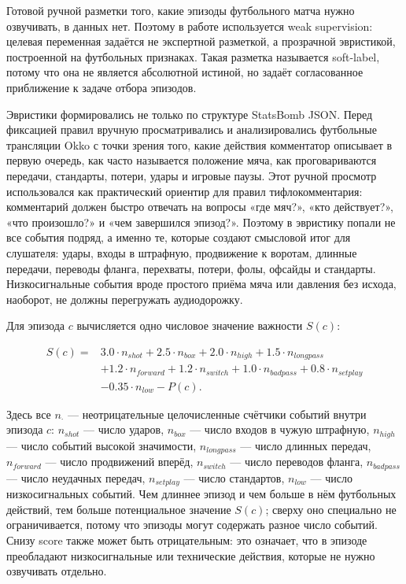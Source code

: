 \documentclass[a4paper,14pt]{extarticle}
\numberwithin{table}{section}
\numberwithin{figure}{section}
\numberwithin{equation}{section}
\begin{document}
Готовой ручной разметки того, какие эпизоды футбольного матча нужно озвучивать, в данных нет. Поэтому в работе используется weak supervision: целевая переменная задаётся не экспертной разметкой, а прозрачной эвристикой, построенной на футбольных признаках. Такая разметка называется soft-label, потому что она не является абсолютной истиной, но задаёт согласованное приближение к задаче отбора эпизодов.

Эвристики формировались не только по структуре StatsBomb JSON. Перед фиксацией правил вручную просматривались и анализировались футбольные трансляции Okko с точки зрения того, какие действия комментатор описывает в первую очередь, как часто называется положение мяча, как проговариваются передачи, стандарты, потери, удары и игровые паузы. Этот ручной просмотр использовался как практический ориентир для правил тифлокомментария: комментарий должен быстро отвечать на вопросы «где мяч?», «кто действует?», «что произошло?» и «чем завершился эпизод?». Поэтому в эвристику попали не все события подряд, а именно те, которые создают смысловой итог для слушателя: удары, входы в штрафную, продвижение к воротам, длинные передачи, переводы фланга, перехваты, потери, фолы, офсайды и стандарты. Низкосигнальные события вроде простого приёма мяча или давления без исхода, наоборот, не должны перегружать аудиодорожку.

Для эпизода $c$ вычисляется одно числовое значение важности $S(c)$:

\begin{equation}
\begin{split}
S(c) ={}& 3.0 \cdot n_{shot} + 2.5 \cdot n_{box} + 2.0 \cdot n_{high} + 1.5 \cdot n_{longpass} \\
&+ 1.2 \cdot n_{forward} + 1.2 \cdot n_{switch} + 1.0 \cdot n_{badpass} + 0.8 \cdot n_{setplay} \\
&- 0.35 \cdot n_{low} - P(c).
\end{split}
\label{eq:soft-score}
\end{equation}

Здесь все $n_{\cdot}$ --- неотрицательные целочисленные счётчики событий внутри эпизода $c$: $n_{shot}$ --- число ударов, $n_{box}$ --- число входов в чужую штрафную, $n_{high}$ --- число событий высокой значимости, $n_{longpass}$ --- число длинных передач, $n_{forward}$ --- число продвижений вперёд, $n_{switch}$ --- число переводов фланга, $n_{badpass}$ --- число неудачных передач, $n_{setplay}$ --- число стандартов, $n_{low}$ --- число низкосигнальных событий. Чем длиннее эпизод и чем больше в нём футбольных действий, тем больше потенциальное значение $S(c)$; сверху оно специально не ограничивается, потому что эпизоды могут содержать разное число событий. Снизу score также может быть отрицательным: это означает, что в эпизоде преобладают низкосигнальные или технические действия, которые не нужно озвучивать отдельно.
\end{document}
